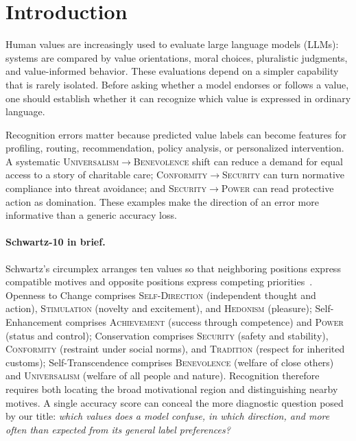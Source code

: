 \documentclass[runningheads,a4paper]{llncs}
\newcommand{\val}[1]{\textsc{#1}}
\begin{document}
\section{Introduction}

Human values are increasingly used to evaluate large language models (LLMs): systems are compared by value orientations, moral choices, pluralistic judgments, and value-informed behavior. These evaluations depend on a simpler capability that is rarely isolated. Before asking whether a model endorses or follows a value, one should establish whether it can recognize which value is expressed in ordinary language.

Recognition errors matter because predicted value labels can become features for profiling, routing, recommendation, policy analysis, or personalized intervention. A systematic \val{Universalism}$\rightarrow$\val{Benevolence} shift can reduce a demand for equal access to a story of charitable care; \val{Conformity}$\rightarrow$\val{Security} can turn normative compliance into threat avoidance; and \val{Security}$\rightarrow$\val{Power} can read protective action as domination. These examples make the direction of an error more informative than a generic accuracy loss.

\paragraph{Schwartz-10 in brief.}
Schwartz's circumplex arranges ten values so that neighboring positions express compatible motives and opposite positions express competing priorities~\cite{schwartz1992universals,schwartz2012refining}. Openness to Change comprises \val{Self-Direction} (independent thought and action), \val{Stimulation} (novelty and excitement), and \val{Hedonism} (pleasure); Self-Enhancement comprises \val{Achievement} (success through competence) and \val{Power} (status and control); Conservation comprises \val{Security} (safety and stability), \val{Conformity} (restraint under social norms), and \val{Tradition} (respect for inherited customs); Self-Transcendence comprises \val{Benevolence} (welfare of close others) and \val{Universalism} (welfare of all people and nature). Recognition therefore requires both locating the broad motivational region and distinguishing nearby motives. A single accuracy score can conceal the more diagnostic question posed by our title: \emph{which values does a model confuse, in which direction, and more often than expected from its general label preferences?}
\end{document}
